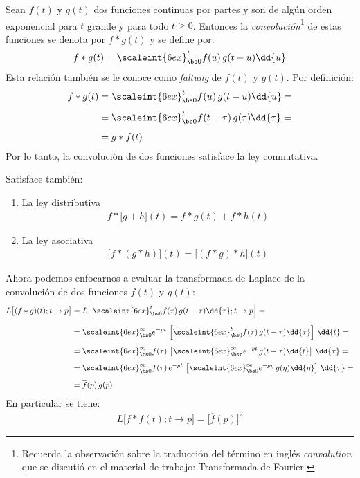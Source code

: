 Sean $f (t)$ y $g (t)$ dos funciones continuas por partes y son de algún orden exponencial para $t$ grande y para todo $t \geq 0$. Entonces la \emph{convolución}\footnote{Recuerda la observación sobre la traducción del término en inglés \emph{convolution} que se discutió en el material de trabajo: Transformada de Fourier.} de estas funciones se denota por $f * g (t)$ y se define por:
\begin{align}
f * g (t) = \scaleint{6ex}_{\bs 0}^{t} f (u) \, g (t - u) \dd{u}
\label{03_55}
\end{align}
Esta relación también se le conoce como \emph{faltung} de $f (t)$ y $g (t)$. Por definición:
\begin{align}
\begin{aligned}
f * g (t) &= \scaleint{6ex}_{\bs 0}^{t} f (u) \, g (t - u) \dd{u} = \\[0.5em]
&= \scaleint{6ex}_{\bs 0}^{t} f (t - \tau) \, g (\tau) \dd{\tau} = \\[0.5em]
&= g * f (t)
\end{aligned}
\label{eq:ecuacion_03_56}
\end{align}
Por lo tanto, la convolución de dos funciones satisface la ley conmutativa.

Satisface también:
\begin{enumerate}
\item La ley distributiva
\begin{align}
f * \big[  g + h  \big](t) = f * g (t) + f * h (t)
\label{eq:ecuacion_03_57}
\end{align}
\item La ley asociativa
\begin{align}
\big[  f * (g * h)  \big](t) = \big[  (f * g) * h  \big] (t)
\label{eq:ecuacion_03_58}
\end{align}
\end{enumerate}
Ahora podemos enfocarnos a evaluar la transformada de Laplace de la convolución de dos funciones $f (t)$ y $g (t)$:
\begin{align}
\begin{aligned}[b]
L \big[  (f * g) (t); t \to p  \big] &= L \left[ \scaleint{6ex}_{\bs 0}^{t} f (\tau) \, g (t - \tau) \dd{\tau}; t \to p \right] = \\[0.5em]
&= \scaleint{6ex}_{\bs 0}^{\infty} e^{-p t} \, \left[ \scaleint{6ex}_{\bs 0}^{t} f (\tau) \, g (t - \tau) \dd{\tau}\right] \, \dd{t} = \\[0.5em]
&= \scaleint{6ex}_{\bs 0}^{\infty} f (\tau) \, \left[ \scaleint{6ex}_{\bs \tau}^{\infty} e^{-p t} \, g (t - \tau) \dd{t}\right] \, \dd{\tau} = \\[0.5em]
&= \scaleint{6ex}_{\bs 0}^{\infty} f(\tau) \, e^{- p t} \, \left[ \scaleint{6ex}_{\bs 0}^{\infty} e^{-p \eta} \, g (\eta) \dd{\eta} \right] \, \dd{\tau} = \\[0.5em]
&= \overline{f} (p) \, \overline{g} (p)
\end{aligned}
\label{eq:ecuacion_03_59}
\end{align}
En particular se tiene:
\begin{align*}
L \big[  f * f (t); t \to p  \big] = \big[  \overline{f} (p)  \big]^{2}
\end{align*}

